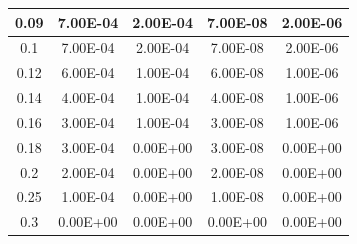 \documentclass[11pt, a4paper, twocolumn]{article}
\begin{document}
\begin{longtable}[c]{|
>{\columncolor[HTML]{EFEFEF}}c |c|c|c|c|}
0.09               & 7.00E-04                               & 2.00E-04                                & 7.00E-08                               & 2.00E-06                                \\ \hline
0.1                & 7.00E-04                               & 2.00E-04                                & 7.00E-08                               & 2.00E-06                                \\ \hline
0.12               & 6.00E-04                               & 1.00E-04                                & 6.00E-08                               & 1.00E-06                                \\ \hline
0.14               & 4.00E-04                               & 1.00E-04                                & 4.00E-08                               & 1.00E-06                                \\ \hline
0.16               & 3.00E-04                               & 1.00E-04                                & 3.00E-08                               & 1.00E-06                                \\ \hline
0.18               & 3.00E-04                               & 0.00E+00                                & 3.00E-08                               & 0.00E+00                                \\ \hline
0.2                & 2.00E-04                               & 0.00E+00                                & 2.00E-08                               & 0.00E+00                                \\ \hline
0.25               & 1.00E-04                               & 0.00E+00                                & 1.00E-08                               & 0.00E+00                                \\ \hline
0.3                & 0.00E+00                               & 0.00E+00                                & 0.00E+00                               & 0.00E+00                                \\ \hline
\end{longtable}



\end{document}
